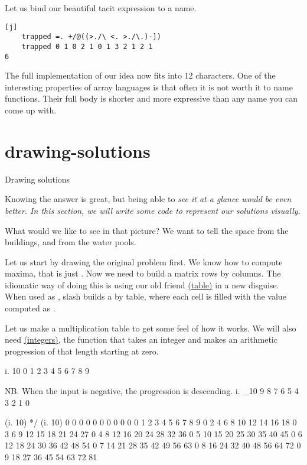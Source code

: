 \documentclass{article}
\begin{document}
Let us bind our beautiful tacit expression to a name.

\begin{verbatim}[j]
    trapped =. +/@((>./\ <. >./\.)-])
    trapped 0 1 0 2 1 0 1 3 2 1 2 1
6
\end{verbatim}

The full implementation of our idea now fits into 12  characters.
One of the interesting properties of array languages is that often it is not worth it to name functions.
Their full body is shorter and more expressive than any name you can come up with.

\section{drawing-solutions}{Drawing solutions}

Knowing the answer is great, but being able to \em{see} it at a glance would be even better.
In this section, we will write some code to represent our solutions visually.

What would we like to see in that picture?
We want to tell the space from the buildings, and from the water pools.

Let us start by drawing the original problem first.
We know how to compute maxima, that is just .
Now we need to build a matrix  rows by  columns.
The idiomatic way of doing this is using our old friend \href{https://code.jsoftware.com/wiki/Vocabulary/slash#dyadic}{\code{/} (table)} in a new disguise. 
When used as , slash builds a  by  table, where each cell  is filled with the value computed as .

Let us make a multiplication table to get some feel of how it works.
We will also need \href{https://code.jsoftware.com/wiki/Vocabulary/idot}{ (integers)}, the function that takes an integer and makes an arithmetic progression of that length starting at zero.

\begin{code}[j]
    i. 10
0 1 2 3 4 5 6 7 8 9

    NB. When the input is negative, the progression is descending.
    i. _10
9 8 7 6 5 4 3 2 1 0

    (i. 10) */ (i. 10)
0 0  0  0  0  0  0  0  0  0
0 1  2  3  4  5  6  7  8  9
0 2  4  6  8 10 12 14 16 18
0 3  6  9 12 15 18 21 24 27
0 4  8 12 16 20 24 28 32 36
0 5 10 15 20 25 30 35 40 45
0 6 12 18 24 30 36 42 48 54
0 7 14 21 28 35 42 49 56 63
0 8 16 24 32 40 48 56 64 72
0 9 18 27 36 45 54 63 72 81
\end{code}
\end{document}
